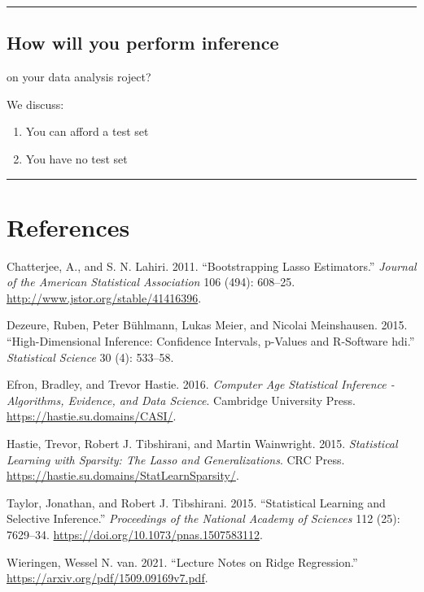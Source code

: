 \documentclass[
  letterpaper,
  DIV=11,
  numbers=noendperiod]{scrartcl}
\providecommand{\tightlist}{%
  \setlength{\itemsep}{0pt}\setlength{\parskip}{0pt}}\usepackage{longtable,booktabs,array}
\newlength{\cslhangindent}
\newlength{\cslentryspacingunit} %
\newenvironment{CSLReferences}[2] %
 {%
  \setlength{\parindent}{0pt}
  \ifodd #1
  \let\oldpar\par
  \def\par{\hangindent=\cslhangindent\oldpar}
  \fi
  \setlength{\parskip}{#2\cslentryspacingunit}
 }%
 {}
\begin{document}
\begin{center}\rule{0.5\linewidth}{0.5pt}\end{center}

\hypertarget{how-will-you-perform-inference}{%
\subsection{How will you perform
inference}\label{how-will-you-perform-inference}}

on your data analysis roject?

We discuss:

\begin{enumerate}
\def\labelenumi{\arabic{enumi})}
\tightlist
\item
  You can afford a test set
\item
  You have no test set
\end{enumerate}

\begin{center}\rule{0.5\linewidth}{0.5pt}\end{center}

\hypertarget{references}{%
\section{References}\label{references}}

\hypertarget{refs}{}
\begin{CSLReferences}{1}{0}
\leavevmode{}%
Chatterjee, A., and S. N. Lahiri. 2011. {``Bootstrapping Lasso
Estimators.''} \emph{Journal of the American Statistical Association}
106 (494): 608--25. \url{http://www.jstor.org/stable/41416396}.

\leavevmode{}%
Dezeure, Ruben, Peter Bühlmann, Lukas Meier, and Nicolai Meinshausen.
2015. {``High-Dimensional Inference: Confidence Intervals, p-Values and
{R}-Software {hdi}.''} \emph{Statistical Science} 30 (4): 533--58.

\leavevmode{}%
Efron, Bradley, and Trevor Hastie. 2016. \emph{Computer Age Statistical
Inference - Algorithms, Evidence, and Data Science}. Cambridge
University Press. \url{https://hastie.su.domains/CASI/}.

\leavevmode{}%
Hastie, Trevor, Robert J. Tibshirani, and Martin Wainwright. 2015.
\emph{Statistical Learning with Sparsity: The Lasso and
Generalizations}. CRC Press.
\url{https://hastie.su.domains/StatLearnSparsity/}.

\leavevmode{}%
Taylor, Jonathan, and Robert J. Tibshirani. 2015. {``Statistical
Learning and Selective Inference.''} \emph{Proceedings of the National
Academy of Sciences} 112 (25): 7629--34.
\url{https://doi.org/10.1073/pnas.1507583112}.

\leavevmode{}%
Wieringen, Wessel N. van. 2021. {``Lecture Notes on Ridge Regression.''}
\url{https://arxiv.org/pdf/1509.09169v7.pdf}.

\end{CSLReferences}
\end{document}
